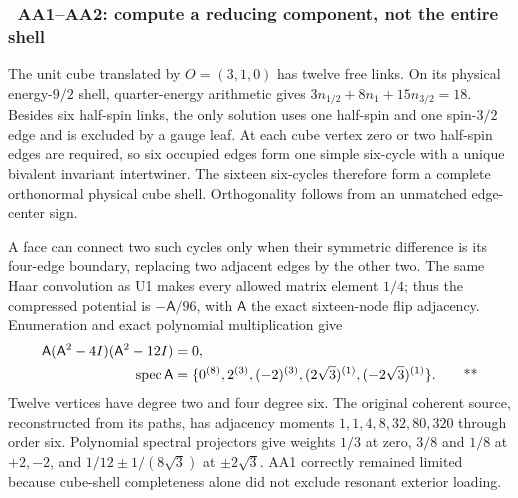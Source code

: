 \subsubsection{\workstar\ AA1--AA2: compute a reducing component, not the entire shell}

The unit cube translated by $O=(3,1,0)$ has twelve free links.  On its physical
energy-$9/2$ shell, quarter-energy arithmetic gives
$3n_{1/2}+8n_1+15n_{3/2}=18$.  Besides six half-spin links, the only solution
uses one half-spin and one spin-$3/2$ edge and is excluded by a gauge leaf.
At each cube vertex zero or two half-spin edges are required, so six occupied
edges form one simple six-cycle with a unique bivalent invariant intertwiner.
The sixteen six-cycles therefore form a complete orthonormal physical cube
shell.  Orthogonality follows from an unmatched edge-center sign.

A face can connect two such cycles only when their symmetric difference is its
four-edge boundary, replacing two adjacent edges by the other two.  The same
Haar convolution as U1 makes every allowed matrix element $1/4$; thus the
compressed potential is $-\mathsf A/96$, with $\mathsf A$ the exact sixteen-node
flip adjacency.  Enumeration and exact polynomial multiplication give
\begin{equation}
 \begin{aligned}
 \mathsf A(\mathsf A^2-4I)(\mathsf A^2-12I)&=0,\\
 \operatorname{spec}\mathsf A&=\{0^{(8)},2^{(3)},(-2)^{(3)},
  (2\sqrt3)^{(1)},(-2\sqrt3)^{(1)}\}.
 \qquad\text{**}
 \end{aligned}
 \label{recent:aa-spectrum}
\end{equation}
Twelve vertices have degree two and four degree six.  The original coherent
source, reconstructed from its paths, has adjacency moments
$1,1,4,8,32,80,320$ through order six.  Polynomial spectral projectors give
weights $1/3$ at zero, $3/8$ and $1/8$ at $+2,-2$, and
$1/12\pm1/(8\sqrt3)$ at $\pm2\sqrt3$.  AA1 correctly remained limited because
cube-shell completeness alone did not exclude resonant exterior loading.

